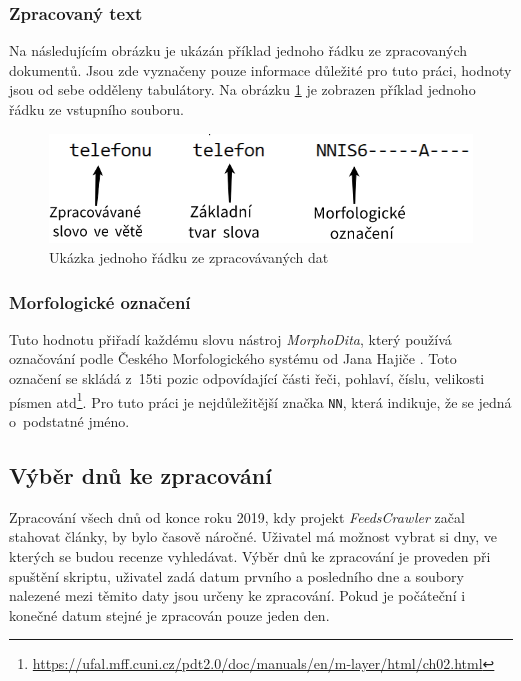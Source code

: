 \subsubsection*{Zpracovaný text}
Na následujícím obrázku je ukázán příklad jednoho řádku ze zpracovaných dokumentů. Jsou zde vyznačeny pouze informace důležité pro tuto práci, hodnoty jsou od sebe odděleny tabulátory.
Na obrázku \ref{fig:priklad_zpracovani_slova} je zobrazen příklad jednoho řádku ze vstupního souboru.

\smallskip

\begin{figure}[h]
    \centering
    \includegraphics[scale=0.35]{obrazky-figures/priklad_zpracovani_slova.png}
    \caption{Ukázka jednoho řádku ze zpracovávaných dat}
    \label{fig:priklad_zpracovani_slova}
\end{figure}



\subsubsection*{Morfologické označení}
Tuto hodnotu přiřadí každému slovu nástroj \textit{MorphoDita}, který používá označování podle Českého Morfologického systému od Jana Hajiče \cite{hajic2004disambiguation}. Toto označení se skládá z~15ti pozic odpovídající části řeči, pohlaví, číslu, velikosti písmen atd\footnote{\url{https://ufal.mff.cuni.cz/pdt2.0/doc/manuals/en/m-layer/html/ch02.html}}. Pro tuto práci je nejdůležitější značka \verb|NN|, která indikuje, že se jedná o~podstatné jméno.

\subsection*{Výběr dnů ke zpracování}
Zpracování všech dnů od konce roku 2019, kdy projekt \textit{FeedsCrawler} začal stahovat články, by bylo časově náročné. Uživatel má možnost vybrat si dny, ve kterých se budou recenze vyhledávat. Výběr dnů ke zpracování je proveden při spuštění skriptu, uživatel zadá datum prvního a posledního dne a soubory nalezené mezi těmito daty jsou určeny ke zpracování. Pokud je počáteční i konečné datum stejné je zpracován pouze jeden den. 

